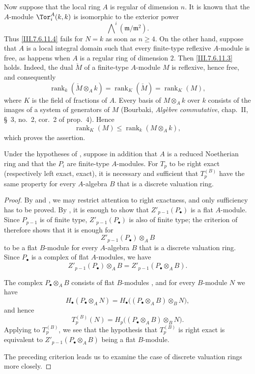 {\begin{remarks}[7.6.11]
Now suppose that the local ring $A$ is regular of dimension
$n$.  It is known \cite{I-17} that the $A$-module
$\Tor_i^A(k,k)$ is isomorphic to the exterior power
\[
  \bigwedge\nolimits^i(\mathfrak m/\mathfrak m^2).
\]
Thus \eqref{III.7.6.11.4} fails for $N=k$ as soon as
$n\geq4$.  On the other hand, suppose that $A$ is a local
integral domain such that every finite-type reflexive
$A$-module is free, as happens when $A$ is a regular ring of
dimension $2$.  Then \eqref{III.7.6.11.3} holds.  Indeed, the
dual $\check M$ of a finite-type $A$-module $M$ is reflexive,
hence free, and consequently
\[
  \operatorname{rank}_k(\check M\otimes_A k)
  =
  \operatorname{rank}_K(\check M)
  =
  \operatorname{rank}_K(M),
\]
where $K$ is the field of fractions of $A$.  Every basis of
$M\otimes_A k$ over $k$ consists of the images of a system of
generators of $M$ (Bourbaki, \emph{Alg\`ebre commutative},
chap.~II, \S~3, no.~2, cor.~2 of prop.~4).  Hence
\[
  \operatorname{rank}_K(M)
  \leq
  \operatorname{rank}_k(M\otimes_A k),
\]
which proves the assertion.
\end{remarks}
}

\begin{proposition}[7.6.2]
\label{III.7.6.2}
Under the hypotheses of , suppose in addition
that $A$ is a reduced Noetherian ring and that the $P_i$ are
finite-type $A$-modules.  For $T_p$ to be right exact
(respectively left exact, exact), it is necessary and
sufficient that $T_p^{(B)}$ have the same property for every
$A$-algebra $B$ that is a discrete valuation ring.
\end{proposition}

\begin{proof}
By  and , we may restrict
attention to right exactness, and only sufficiency has to be
proved.  By , it is enough to show that
$Z'_{p-1}(P_\bullet)$ is a flat $A$-module.  Since
$P_{p-1}$ is of finite type, $Z'_{p-1}(P_\bullet)$ is also of
finite type; the criterion of  therefore
shows that it is enough for
\[
  Z'_{p-1}(P_\bullet)\otimes_A B
\]
to be a flat $B$-module for every $A$-algebra $B$ that is a
discrete valuation ring.  Since $P_\bullet$ is a complex of
flat $A$-modules, we have
\[
  Z'_{p-1}(P_\bullet)\otimes_A B
  =
  Z'_{p-1}(P_\bullet\otimes_A B).
\]

The complex $P_\bullet\otimes_A B$ consists of flat
$B$-modules , and for every $B$-module $N$
we have
\[
  H_\bullet(P_\bullet\otimes_A N)
  =
  H_\bullet\bigl((P_\bullet\otimes_A B)\otimes_B N\bigr),
\]
and hence
\[
  T_p^{(B)}(N)
  =
  H_p\bigl((P_\bullet\otimes_A B)\otimes_B N\bigr).
\]
Applying  to $T_p^{(B)}$, we see that the
hypothesis that $T_p^{(B)}$ is right exact is equivalent to
$Z'_{p-1}(P_\bullet\otimes_A B)$ being a flat $B$-module.

The preceding criterion leads us to examine the case of
discrete valuation rings more closely.
\end{proof}

